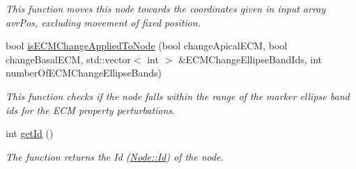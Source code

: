 \begin{DoxyCompactItemize}
\begin{DoxyCompactList}\small\item\em This function moves this node towards the coordinates given in input array avr\+Pos, excluding movement of fixed position. \end{DoxyCompactList}\item 
\hypertarget{classNode_abf7a4917252fff90bd2ff2c50bfc5d21}{}bool \hyperlink{classNode_abf7a4917252fff90bd2ff2c50bfc5d21}{is\+E\+C\+M\+Change\+Applied\+To\+Node} (bool change\+Apical\+E\+C\+M, bool change\+Basal\+E\+C\+M, std\+::vector$<$ int $>$ \&E\+C\+M\+Change\+Ellipse\+Band\+Ids, int number\+Of\+E\+C\+M\+Change\+Ellipse\+Bands)\label{classNode_abf7a4917252fff90bd2ff2c50bfc5d21}

\begin{DoxyCompactList}\small\item\em This function checks if the node falls within the range of the marker ellipse band ids for the E\+C\+M property perturbations. \end{DoxyCompactList}\item 
int \hyperlink{classNode_a3c7b8ccf4dab44216b997c5f63f11d9f}{get\+Id} ()
\begin{DoxyCompactList}\small\item\em The function returns the Id (\hyperlink{classNode_a1bd379569cc1a8b96432e61971aed4d9}{Node\+::\+Id}) of the node. \end{DoxyCompactList}\end{DoxyCompactItemize}
